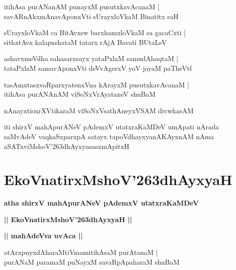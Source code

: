 \documentclass[twoside,12pt,openright]{book}
\def\S{\char'263}
\newcounter{shloka}[chapter]
\def\uvaca#1{\centerline{{\large\textbf{#1}}}}
\begin{document}
\begin{shloka}%
itihAsa purANanAM punayxM pusutxkavAcanaM |\\
savARnAkxmAnavAponxVti sUrayxloVkaM Binatitx saH 
\end{shloka}

\begin{shloka}%
sUrayxloVkaM ca BitAvxsw barxhamxloVkaM sa gacaCxti |\\
sithxtAvx kalapxshataM tatarx rAjA Bavati BUtaLeV
\end{shloka}

\begin{shloka}%
ashavxmeVdha sahasarxsayx yataPxlaM samudAhaqtaM |\\
tataPxlaM samavAponxVti deVvAgerxV yoV jayaM paTheVtf
\end{shloka}

\begin{shloka}%
tasAmxtasxvaRparxyatenxVna kArayxM pusutxkavAcanaM |\\
itihAsa purANAnAM viSoNxVrAyataneV shuBaM 
\end{shloka}

\begin{shloka}%
nAnayxtioxrXVtikaraM viSoNxVsathAneyxVSAM divwkasAM 
\end{shloka}

\begin{center}
iti shirxV mahApurANeV pAdemxV utatxraKaMDeV umApati nArada saMvAdeV  
vaqkaSxparxpA satayx tapoVdhayxyanAKAyxnAM nAma aSATxviMshoV\S dhAyxyasasxmApitxH
\end{center}

\chapter{EkoVnatirxMshoV\S dhAyxyaH}

\begin{center}
{\LARGE\bfseries atha shirxV mahApurANeV pAdemxV utatxraKaMDeV}
\end{center}

\begin{center}
{\LARGE\bfseries || EkoVnatirxMshoV\S dhAyxyaH ||}
\end{center}

\uvaca{|| mahAdeVva uvAca ||}

\begin{shloka}%
atArxpuyxdAharaMtiVmamitihAsaM purAtanaM |\\
purANaM paramaM puNayxM savaRpApaharaM shuBaM
\end{shloka}
\end{document}
